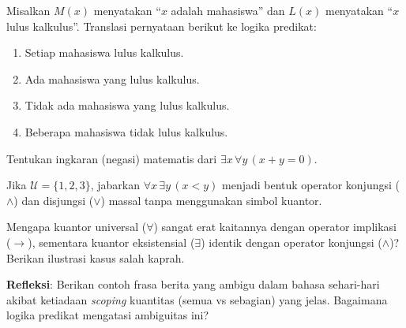 \documentclass[../main]{subfiles}
\begin{document}
\begin{latihan}
  \item Misalkan $M(x)$ menyatakan ``$x$ adalah mahasiswa'' dan $L(x)$ menyatakan ``$x$ lulus kalkulus''. Translasi pernyataan berikut ke logika predikat:
  \begin{enumerate}
      \item Setiap mahasiswa lulus kalkulus.
      \item Ada mahasiswa yang lulus kalkulus.
      \item Tidak ada mahasiswa yang lulus kalkulus.
      \item Beberapa mahasiswa tidak lulus kalkulus.
  \end{enumerate}
  \item Tentukan ingkaran (negasi) matematis dari $\exists x \, \forall y \, (x + y = 0)$.
  \item Jika $\mathcal{U} = \{1, 2, 3\}$, jabarkan $\forall x \, \exists y \, (x < y)$ menjadi bentuk operator konjungsi ($\land$) dan disjungsi ($\lor$) massal tanpa menggunakan simbol kuantor.
  \item Mengapa kuantor universal ($\forall$) sangat erat kaitannya dengan operator implikasi ($\rightarrow$), sementara kuantor eksistensial ($\exists$) identik dengan operator konjungsi ($\land$)? Berikan ilustrasi kasus salah kaprah.
  \item \textbf{Refleksi}: Berikan contoh frasa berita yang ambigu dalam bahasa sehari-hari akibat ketiadaan \textit{scoping} kuantitas (semua vs sebagian) yang jelas. Bagaimana logika predikat mengatasi ambiguitas ini?
\end{latihan}

\end{document}
